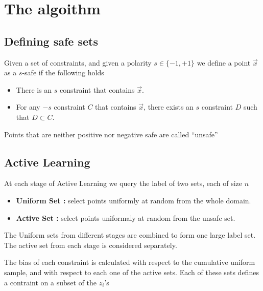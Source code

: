\documentclass{article}
\newcommand{\x}{\vec{x}}
\begin{document}
\section{The algoithm}

\subsection{Defining safe sets}

Given a set of constraints, and given a polarity  $s \in
\{-1,+1\}$ we define a point $\x$ as a $s$-safe if
the following holds
\begin{itemize}
\item There is an $s$ constraint that contains $\x$.
\item For any $-s$ constraint $C$ that contains $\x$, there exists an
  $s$ constraint $D$ such that $D \subset C$. 
\end{itemize}

Points that are neither positive nor negative safe are called
``unsafe''

\subsection{Active Learning}

At each stage of Active Learning we query the label of two sets, each
of size $n$
\begin{itemize}
\item {\bf Uniform Set :} select points uniformly at random from the whole
  domain.
\item {\bf Active Set :} select points uniformaly at random from the unsafe
  set.
\end{itemize}

The Uniform sets from different stages are combined to form one
large label set. The active set from each stage is considered
separately.

The bias of each constraint is calculated with respect to the
cumulative uniform sample, and with respect to each one of the active
sets. Each of these sets defines a contraint on a subset of the $z_i$'s 
\end{document}
